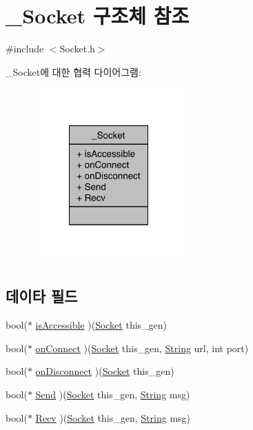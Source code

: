 \hypertarget{struct___socket}{\section{\-\_\-\-Socket 구조체 참조}
\label{struct___socket}
}


{\ttfamily \#include $<$Socket.\-h$>$}



\-\_\-\-Socket에 대한 협력 다이어그램\-:\nopagebreak
\begin{figure}[H]
\begin{center}
\leavevmode
\includegraphics[width=164pt]{d2/d9f/struct___socket__coll__graph}
\end{center}
\end{figure}
\subsection*{데이타 필드}
\begin{DoxyCompactItemize}
\item 
bool($\ast$ \hyperlink{struct___socket_ac1ad80a37ffe5c487d7951ba7bb3f825}{is\-Accessible} )(\hyperlink{_socket_8h_acf44cb15f4425e3df069d9e6639bd989}{Socket} this\-\_\-gen)
\item 
bool($\ast$ \hyperlink{struct___socket_a12fc7a8a0e3742d18dec08defeb67435}{on\-Connect} )(\hyperlink{_socket_8h_acf44cb15f4425e3df069d9e6639bd989}{Socket} this\-\_\-gen, \hyperlink{dit_8h_a2efe6d463d80744789f228f5dc4baa39}{String} url, int port)
\item 
bool($\ast$ \hyperlink{struct___socket_ad7a809e33935ee525606738714730f7a}{on\-Disconnect} )(\hyperlink{_socket_8h_acf44cb15f4425e3df069d9e6639bd989}{Socket} this\-\_\-gen)
\item 
bool($\ast$ \hyperlink{struct___socket_a0d82d1d1d78c09f2fa3a3e5709527ae5}{Send} )(\hyperlink{_socket_8h_acf44cb15f4425e3df069d9e6639bd989}{Socket} this\-\_\-gen, \hyperlink{dit_8h_a2efe6d463d80744789f228f5dc4baa39}{String} msg)
\item 
bool($\ast$ \hyperlink{struct___socket_a0a7bae2527254e83c0e79cc118dc8744}{Recv} )(\hyperlink{_socket_8h_acf44cb15f4425e3df069d9e6639bd989}{Socket} this\-\_\-gen, \hyperlink{dit_8h_a2efe6d463d80744789f228f5dc4baa39}{String} msg)
\end{DoxyCompactItemize}


